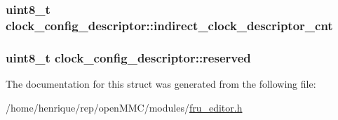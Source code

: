 \hypertarget{structclock__config__descriptor_ab9ef769de545cb0c80c7a516ede75798}{
\subsubsection[{indirect\-\_\-clock\-\_\-descriptor\-\_\-cnt}]{\setlength{\rightskip}{0pt plus 5cm}uint8\-\_\-t clock\-\_\-config\-\_\-descriptor\-::indirect\-\_\-clock\-\_\-descriptor\-\_\-cnt}}\label{structclock__config__descriptor_ab9ef769de545cb0c80c7a516ede75798}
\hypertarget{structclock__config__descriptor_aa8a081f5969c1c406cf7d9bfab47b258}{
\subsubsection[{reserved}]{\setlength{\rightskip}{0pt plus 5cm}uint8\-\_\-t clock\-\_\-config\-\_\-descriptor\-::reserved}}\label{structclock__config__descriptor_aa8a081f5969c1c406cf7d9bfab47b258}


The documentation for this struct was generated from the following file\-:\begin{DoxyCompactItemize}
\item 
/home/henrique/rep/open\-M\-M\-C/modules/\hyperlink{fru__editor_8h}{fru\-\_\-editor.\-h}\end{DoxyCompactItemize}
